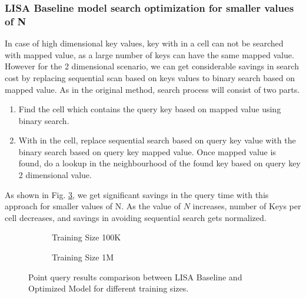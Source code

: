 \subsubsection {LISA Baseline model search optimization for smaller values of N}
In case of high dimensional key values, key with in a cell can not be searched with mapped value, as a large number of keys can have the same mapped value. However for the 2 dimensional scenario, we can get considerable savings in search cost by replacing sequential scan based on keys values to binary search based on mapped value. As in the original method, search process  will consist of two parts.
\begin{enumerate}
	\item Find the cell which contains the query key based on mapped value using binary search. 
	\item With in the cell, replace sequential search based on query key value with the  binary search based on query key mapped value. Once mapped value is found, do a lookup in the neighbourhood of the found key based on query key 2 dimensional value. 
\end{enumerate}
As shown in Fig. \ref{fig:LISA_Baseline_Optimization}, we get significant savings in the query time with this approach for smaller values of N. As the value of $N$ increases, number of Keys per cell decreases, and savings in avoiding sequential search gets normalized. 


\begin{figure}
 \centering
     \begin{subfigure}[b]{0.45\textwidth}
         \centering
         
         \caption{Training Size 100K}
         \label{fig:2d_exp4_3_1}
     \end{subfigure}
     \begin{subfigure}[b]{0.45\textwidth}
         \centering
         
         \caption{Training Size 1M}
         \label{fig:2d_exp4_3_2}
     \end{subfigure}
     \caption{Point query results comparison between LISA Baseline and Optimized Model for different training sizes.}
     \label{fig:LISA_Baseline_Optimization}
\end{figure}


